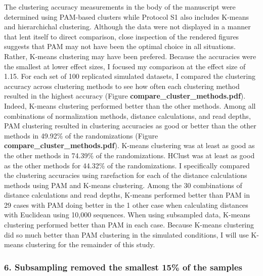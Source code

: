 \documentclass[
]{article}
\begin{document}
The clustering accuracy measurements in the body of the manuscript were
determined using PAM-based clusters while Protocol S1 also includes
K-means and hierarchichal clustering. Although the data were not
displayed in a manner that lent itself to direct comparison, close
inspection of the rendered figures suggests that PAM may not have been
the optimal choice in all situations. Rather, K-means clustering may
have been prefered. Because the accuracies were the smallest at lower
effect sizes, I focused my comparison at the effect size of 1.15. For
each set of 100 replicated simulated datasets, I compared the clustering
accuracy across clustering methods to see how often each clustering
method resulted in the highest accuracy (Figure
\textbf{compare\_cluster\_methods.pdf}). Indeed, K-means clustering
performed better than the other methods. Among all combinations of
normalization methods, distance calculations, and read depths, PAM
clustering resulted in clustering accuracies as good or better than the
other methods in 49.92\% of the randomizations (Figure
\textbf{compare\_cluster\_methods.pdf}). K-means clustering was at least
as good as the other methods in 74.39\% of the randomizations. HClust
was at least as good as the other methods for 44.32\% of the
randomizations. I specifically compared the clustering accuracies using
rarefaction for each of the distance calculations methods using PAM and
K-means clustering. Among the 30 combinations of distance calculations
and read depths, K-means performed better than PAM in 29 cases with PAM
doing better in the 1 other case when calculating distances with
Euclidean using 10,000 sequences. When using subsampled data, K-means
clustering performed better than PAM in each case. Because K-means
clustering did so much better than PAM clustering in the simulated
conditions, I will use K-means clustering for the remainder of this
study.

\hypertarget{subsampling-removed-the-smallest-15-of-the-samples}{%
\subsubsection{6. Subsampling removed the smallest 15\% of the
samples}\label{subsampling-removed-the-smallest-15-of-the-samples}}
\end{document}
